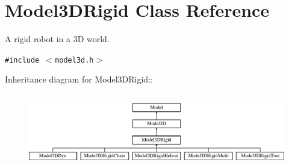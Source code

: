 \section{Model3DRigid  Class Reference}
\label{classModel3DRigid}
A rigid robot in a 3D world. 


{\tt \#include $<$model3d.h$>$}

Inheritance diagram for Model3DRigid::\begin{figure}[H]
\begin{center}
\leavevmode
\includegraphics[height=3.24638cm]{classModel3DRigid}
\end{center}
\end{figure}
